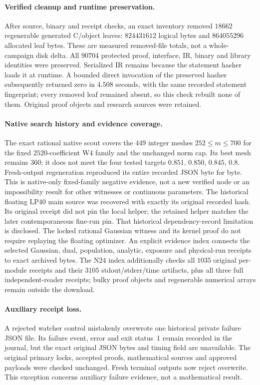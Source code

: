 \documentclass[11pt]{article}
\begin{document}
\paragraph{Verified cleanup and runtime preservation.}
After source, binary and receipt checks, an exact inventory removed \(18662\)
regenerable generated C/object leaves: \(824431612\) logical bytes and
\(864055296\) allocated leaf bytes. These are measured removed-file totals,
not a whole-campaign disk delta. All \(90704\) protected proof, interface,
IR, binary and library identities were preserved. Serialized IR remains
because the statement hasher loads it at runtime. A bounded direct invocation
of the preserved hasher subsequently returned zero in \(4.508\) seconds,
with the same recorded statement fingerprint; every removed leaf remained
absent, so this check rebuilt none of them. Original proof objects and
research sources were retained.

\paragraph{Native search history and evidence coverage.}
The exact rational native scout covers the \(449\) integer meshes
\(252\le m\le700\) for the fixed \(2520\)-coefficient W4 family and the
unchanged norm cap. Its best mesh remains \(360\); it does not meet the
four tested targets \(0.851\), \(0.850\), \(0.845\), \(0.8\).
Fresh-output regeneration reproduced its entire recorded JSON byte for byte.
This is native-only fixed-family negative evidence, not a new verified node
or an impossibility result for other witnesses or continuous parameters.
The historical floating LP40 main source was recovered with exactly its
original recorded hash. Its original receipt did not pin the local helper;
the retained helper matches the later contemporaneous fine-run pin. That
historical dependency-record limitation is disclosed. The locked rational
Gaussian witness and its kernel proof do not require replaying the floating
optimizer. An explicit evidence index connects the selected Gaussian,
dual, population, analytic, exposure and physical-run receipts to exact
archived bytes. The N24 index additionally checks all \(1035\) original
per-module receipts and their \(3105\) stdout/stderr/time artifacts, plus
all three full independent-reader receipts; bulky proof objects and
regenerable numerical arrays remain outside the download.

\paragraph{Auxiliary receipt loss.}
A rejected watcher control mistakenly overwrote one historical private failure
JSON file. Its failure event, error and exit status~1 remain recorded in the
journal, but the exact original JSON bytes and timing field are unavailable.
The original primary locks, accepted proofs, mathematical sources and approved
payloads were checked unchanged. Fresh terminal outputs now reject overwrite.
This exception concerns auxiliary failure evidence, not a mathematical result.
\end{document}
